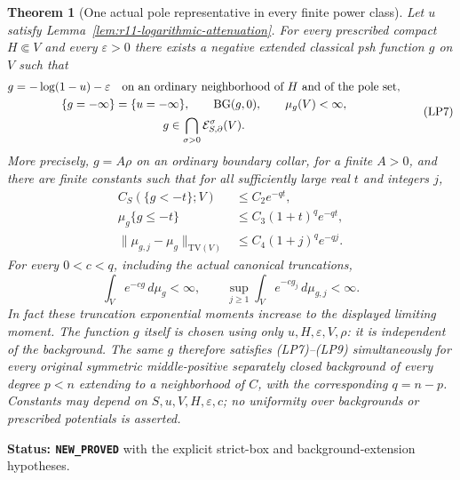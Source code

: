 \documentclass[11pt,a4paper]{article}
\numberwithin{equation}{section}
\newtheorem{theorem}{Theorem}[section]
\theoremstyle{definition}
\theoremstyle{remark}
\begin{document}
\begin{theorem}[One actual pole representative in every finite power class]
\label{thm:r11-all-power-pole-representative}
Let $u$ satisfy Lemma~\ref{lem:r11-logarithmic-attenuation}.
For every prescribed compact $H\Subset V$ and every
$\varepsilon>0$ there exists a negative extended classical
psh function $g$ on $V$ such that
\[
 \begin{gathered}
  g=-\log(1-u)-\varepsilon
       \quad\hbox{on an ordinary neighborhood of }H
                      \hbox{ and of the pole set},\\
  \{g=-\infty\}=\{u=-\infty\},\qquad
  \mathrm{BG}(g,0),\qquad \mu_g(V)<\infty,\\
  g\in\bigcap_{\sigma>0}\mathcal E^\sigma_{S,\partial}(V).
 \end{gathered}
 \tag{LP7}
\]
More precisely, $g=A\rho$ on an ordinary boundary collar,
for a finite $A>0$, and there are finite constants such that
for all sufficiently large real $t$ and integers $j$,
\[
 \begin{split}
 C_S(\{g<-t\};V)&\leq C_2e^{-qt},\\
 \mu_g\{g\leq-t\}&\leq C_3(1+t)^q e^{-qt},\\
 \|\mu_{g,j}-\mu_g\|_{\mathrm{TV}(V)}
                  &\leq C_4(1+j)^q e^{-qj}.
 \end{split}
 \tag{LP8}
\]
For every $0<c<q$, including the actual canonical truncations,
\[
       \int_V e^{-cg}\,d\mu_g<\infty,
       \qquad
       \sup_{j\geq1}\int_Ve^{-cg_j}\,d\mu_{g,j}<\infty.
 \tag{LP9}
\]
In fact these truncation exponential moments increase to the
displayed limiting moment. The function $g$ itself is chosen
using only $u,H,\varepsilon,V,\rho$: it is independent of the
background. The same $g$ therefore satisfies (LP7)--(LP9)
simultaneously for every original symmetric middle-positive
separately closed background of every degree $p<n$ extending
to a neighborhood of $C$, with the corresponding $q=n-p$.
Constants may depend on $S,u,V,H,\varepsilon,c$; no uniformity
over backgrounds or prescribed potentials is asserted.
\end{theorem}

\noindent\textbf{Status: \texttt{NEW\_PROVED}} with the
explicit strict-box and background-extension hypotheses.
\end{document}
